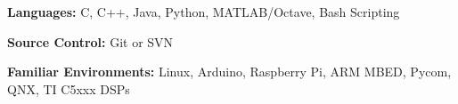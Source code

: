
\textbf{Languages: }
C, C++, Java, Python, MATLAB/Octave, Bash Scripting

\textbf{Source Control: }
Git or SVN

\textbf{Familiar Environments: }
Linux, Arduino, Raspberry Pi, ARM MBED, Pycom, QNX, TI C5xxx DSPs
